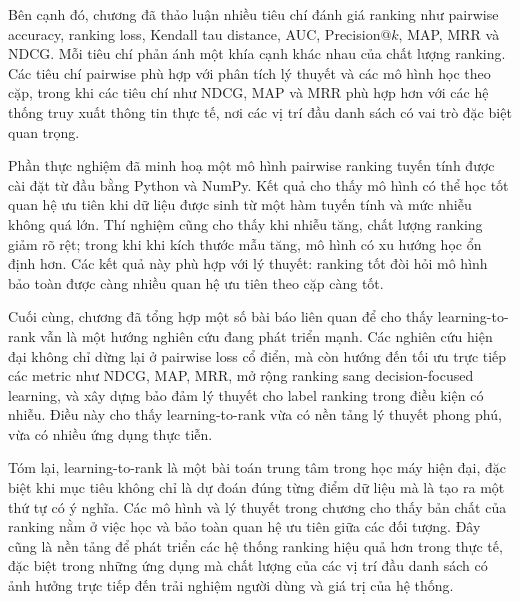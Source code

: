Bên cạnh đó, chương đã thảo luận nhiều tiêu chí đánh giá ranking như pairwise accuracy, ranking loss, Kendall tau distance, AUC, Precision@\(k\), MAP, MRR và NDCG. Mỗi tiêu chí phản ánh một khía cạnh khác nhau của chất lượng ranking. Các tiêu chí pairwise phù hợp với phân tích lý thuyết và các mô hình học theo cặp, trong khi các tiêu chí như NDCG, MAP và MRR phù hợp hơn với các hệ thống truy xuất thông tin thực tế, nơi các vị trí đầu danh sách có vai trò đặc biệt quan trọng.

Phần thực nghiệm đã minh hoạ một mô hình pairwise ranking tuyến tính được cài đặt từ đầu bằng Python và NumPy. Kết quả cho thấy mô hình có thể học tốt quan hệ ưu tiên khi dữ liệu được sinh từ một hàm tuyến tính và mức nhiễu không quá lớn. Thí nghiệm cũng cho thấy khi nhiễu tăng, chất lượng ranking giảm rõ rệt; trong khi khi kích thước mẫu tăng, mô hình có xu hướng học ổn định hơn. Các kết quả này phù hợp với lý thuyết: ranking tốt đòi hỏi mô hình bảo toàn được càng nhiều quan hệ ưu tiên theo cặp càng tốt.

Cuối cùng, chương đã tổng hợp một số bài báo liên quan để cho thấy learning-to-rank vẫn là một hướng nghiên cứu đang phát triển mạnh. Các nghiên cứu hiện đại không chỉ dừng lại ở pairwise loss cổ điển, mà còn hướng đến tối ưu trực tiếp các metric như NDCG, MAP, MRR, mở rộng ranking sang decision-focused learning, và xây dựng bảo đảm lý thuyết cho label ranking trong điều kiện có nhiễu. Điều này cho thấy learning-to-rank vừa có nền tảng lý thuyết phong phú, vừa có nhiều ứng dụng thực tiễn.

Tóm lại, learning-to-rank là một bài toán trung tâm trong học máy hiện đại, đặc biệt khi mục tiêu không chỉ là dự đoán đúng từng điểm dữ liệu mà là tạo ra một thứ tự có ý nghĩa. Các mô hình và lý thuyết trong chương cho thấy bản chất của ranking nằm ở việc học và bảo toàn quan hệ ưu tiên giữa các đối tượng. Đây cũng là nền tảng để phát triển các hệ thống ranking hiệu quả hơn trong thực tế, đặc biệt trong những ứng dụng mà chất lượng của các vị trí đầu danh sách có ảnh hưởng trực tiếp đến trải nghiệm người dùng và giá trị của hệ thống.